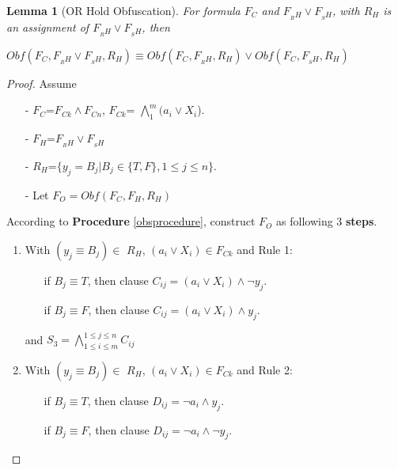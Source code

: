 \documentclass[conference,compsocconf]{IEEEtran}
\newtheorem{lemma}{\textbf{Lemma}}
\begin{document}
\begin{lemma}[OR Hold Obfuscation]\label{ORrelation-Holding-Obfuscation}
For formula $F_C$ and $F_{_RH}\vee F_{_SH}$, with $R_H$ is an assignment of $F_{_RH} \vee F_{_SH}$,
then

$Obf(F_C,F_{_RH}\vee F_{_SH},R_H)\equiv Obf(F_C,F_{_RH},R_H) \vee Obf(F_C,F_{_SH},R_H)$
\end{lemma}
\begin{proof}
Assume
\begin{enumerate}
 \item[-]$F_C$=$F_{Ck} \wedge F_{Cn}$,  $F_{Ck}$= $\bigwedge_{1}^{m}(a_i\vee X_i$).  
 \item[-]$F_H$=$F_{_RH}\vee F_{_SH}$
 \item[-]$R_H$=$\{y_j=B_j| B_j \in \{T,F\}, 1\leqslant j\leqslant n\}$.
 \item[-]Let $F_O=Obf(F_C,F_H,R_H)$
 \end{enumerate}
According to \textbf{Procedure} \ref{obsprocedure}, construct $F_O$ as following 3 \textbf{steps}.
\begin{enumerate}
\item With $(y_j\equiv B_j)\in$ $R_H$, $(a_i\vee X_i) \in F_{Ck}$ and Rule 1:
\begin{itemize}
 \item[] if $B_j\equiv T$, then clause $C_{ij}=(a_i\vee X_i)\wedge \neg y_j$.
 \item[] if $B_j\equiv F$, then clause $C_{ij}=(a_i\vee X_i)\wedge y_j$.
\end{itemize}
and $S_3=\bigwedge_{1\leqslant i\leqslant m}^{1\leqslant j\leqslant n} C_{ij}$
\item
With $(y_j\equiv  B_j)\in $ $R_H$, $(a_i\vee X_i) \in F_{Ck}$ and Rule 2:
\begin{itemize}
 \item[] if $B_j\equiv T$, then clause $D_{ij}=\neg a_i\wedge y_j$.
 \item[] if $B_j\equiv F$, then clause $D_{ij}=\neg a_i\wedge \neg y_j$.

\end{itemize}
\end{enumerate}
\end{proof}
\end{document}
